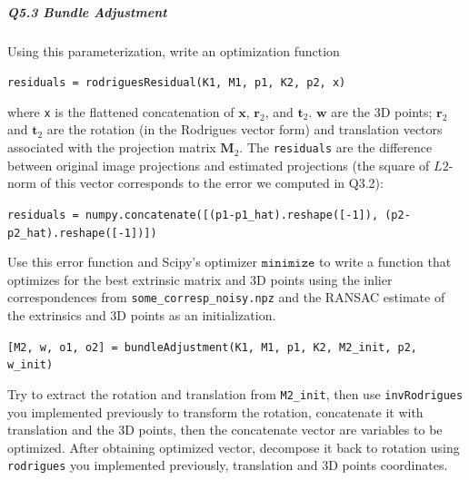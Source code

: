 
\begin{your_solution}[title=Q5.2,height=5.5cm,width=\linewidth]
\end{your_solution}

\subparagraph*{Q5.3 Bundle Adjustment}

Using this parameterization, write an optimization function
\begin{center}
\texttt{residuals = rodriguesResidual(K1, M1, p1, K2, p2, x)}
\end{center}
where \texttt{x} is the flattened concatenation of $\mathbf{x}$, $\mathbf{r}_2$, and $\mathbf{t}_2$. $\mathbf{w}$ are the 3D points; $\mathbf{r}_2$ and $\mathbf{t}_2$ are the rotation (in the Rodrigues vector form) and translation vectors associated with the projection matrix $\mathbf{M}_2$. The \texttt{residuals} are the difference between original image projections and estimated projections (the square of $L2$-norm of this vector corresponds to the error we computed in Q3.2):
\begin{center}
\texttt{residuals = numpy.concatenate([(p1-p1\_hat).reshape([-1]), (p2-p2\_hat).reshape([-1])])}
\end{center}

Use this error function and Scipy's optimizer $\texttt{minimize}$ to write a function that optimizes for the best extrinsic matrix and 3D points using the inlier correspondences from \texttt{some\_corresp\_noisy.npz} and the RANSAC estimate of the extrinsics and 3D points as an initialization.

\begin{center}
\texttt{[M2, w, o1, o2] = bundleAdjustment(K1, M1, p1, K2, M2\_init, p2, w\_init)}
\end{center}

Try to extract the rotation and translation from \texttt{M2\_init}, then use \texttt{invRodrigues} you implemented previously to transform the rotation, concatenate it with translation and the 3D points, then the concatenate vector are variables to be optimized. After obtaining optimized vector, decompose it back to rotation using \texttt{rodrigues} you implemented previously, translation and 3D points coordinates.


